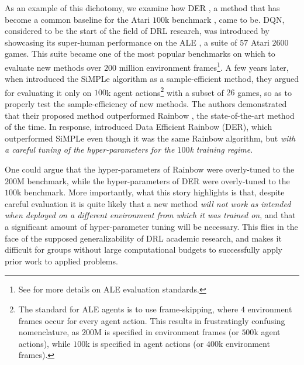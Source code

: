 As an example of this dichotomy, we examine how DER \citep{hasselt19when}, a method that has become a common baseline for the Atari $100$k benchmark \citep{kaiser2020modelbased}, came to be. DQN, considered to be the start of the field of DRL research, was introduced by showcasing its super-human performance on the ALE \citep{bellemare2012ale}, a suite of $57$ Atari $2600$ games. This suite became one of the most popular benchmarks on which to evaluate new methods over $200$ million environment frames\footnote{See \citep{machado2018revisiting} for more details on ALE evaluation standards.}. A few years later, when \citet{kaiser2020modelbased} introduced the SiMPLe algorithm as a sample-efficient method, they argued for evaluating it only on $100$k agent actions\footnote{The standard for ALE agents is to use frame-skipping, where $4$ environment frames occur for every agent action. This results in frustratingly confusing nomenclature, as $200$M is specified in environment frames (or $500$k agent actions), while $100$k is specified in agent actions (or $400$k environment frames).} with a subset of $26$ games, so as to properly test the sample-efficiency of new methods. The authors demonstrated that their proposed method outperformed Rainbow \citep{Hessel2018RainbowCI}, the state-of-the-art method of the time. In response, \citet{hasselt19when} introduced Data Efficient Rainbow (DER), which outperformed SiMPLe even though it was the same Rainbow algorithm, but {\em with a careful tuning of the hyper-parameters for the $100$k training regime}.

One could argue that the hyper-parameters of Rainbow were overly-tuned to the $200$M benchmark, while the hyper-parameters of DER were overly-tuned to the $100$k benchmark. More importantly, what this story highlights is that, despite careful evaluation it is quite likely that a new method {\em will not work as intended when deployed on a different environment from which it was trained on}, and that a significant  amount of hyper-parameter tuning will be necessary. This flies in the face of the supposed generalizability of DRL academic research, and makes it difficult for groups without large computational budgets to successfully apply prior work to applied problems.


